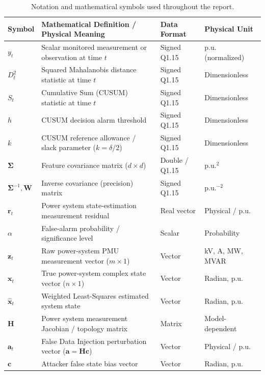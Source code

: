 \documentclass[11pt,a4paper]{report}
\begin{document}
\begin{table}[H]
\centering
\caption{Notation and mathematical symbols used throughout the report.}
\label{tab:notation}
\small
\renewcommand{\arraystretch}{1.25}
\begin{tabular}{|p{2.2cm}|p{7.2cm}|p{2.6cm}|p{2.2cm}|}
\hline
\textbf{Symbol} & \textbf{Mathematical Definition / Physical Meaning} & \textbf{Data Format} & \textbf{Physical Unit} \\
\hline
$y_t$ & Scalar monitored measurement or observation at time $t$ & Signed Q1.15 & p.u. (normalized) \\
\hline
$D_t^2$ & Squared Mahalanobis distance statistic at time $t$ & Signed Q1.15 & Dimensionless \\
\hline
$S_t$ & Cumulative Sum (CUSUM) statistic at time $t$ & Signed Q1.15 & Dimensionless \\
\hline
$h$ & CUSUM decision alarm threshold & Signed Q1.15 & Dimensionless \\
\hline
$k$ & CUSUM reference allowance / slack parameter ($k = \delta/2$) & Signed Q1.15 & Dimensionless \\
\hline
$\boldsymbol{\Sigma}$ & Feature covariance matrix ($d \times d$) & Double / Q1.15 & $\text{p.u.}^2$ \\
\hline
$\boldsymbol{\Sigma}^{-1}, \boldsymbol{W}$ & Inverse covariance (precision) matrix & Signed Q1.15 & $\text{p.u.}^{-2}$ \\
\hline
$\boldsymbol{r}_t$ & Power system state-estimation measurement residual & Real vector & Physical / p.u. \\
\hline
$\alpha$ & False-alarm probability / significance level & Scalar & Probability \\
\hline
$\boldsymbol{z}_t$ & Raw power-system PMU measurement vector ($m \times 1$) & Vector & kV, A, MW, MVAR \\
\hline
$\boldsymbol{x}_t$ & True power-system complex state vector ($n \times 1$) & Vector & Radian, p.u. \\
\hline
$\hat{\boldsymbol{x}}_t$ & Weighted Least-Squares estimated system state & Vector & Radian, p.u. \\
\hline
$\boldsymbol{H}$ & Power system measurement Jacobian / topology matrix & Matrix & Model-dependent \\
\hline
$\boldsymbol{a}_t$ & False Data Injection perturbation vector ($\boldsymbol{a} = \boldsymbol{H}\boldsymbol{c}$) & Vector & Physical / p.u. \\
\hline
$\boldsymbol{c}$ & Attacker false state bias vector & Vector & Radian, p.u. \\

\end{tabular}
\end{table}
\end{document}
